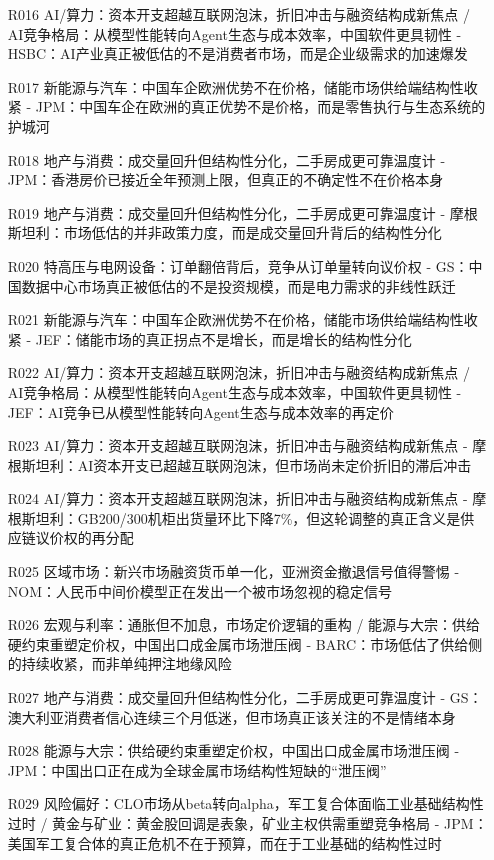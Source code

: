 \documentclass[11pt]{ctexart}
\begin{document}
\begin{itemize}
  \item [R016] AI/算力：资本开支超越互联网泡沫，折旧冲击与融资结构成新焦点 / AI竞争格局：从模型性能转向Agent生态与成本效率，中国软件更具韧性 - HSBC：AI产业真正被低估的不是消费者市场，而是企业级需求的加速爆发
  \item [R017] 新能源与汽车：中国车企欧洲优势不在价格，储能市场供给端结构性收紧 - JPM：中国车企在欧洲的真正优势不是价格，而是零售执行与生态系统的护城河
  \item [R018] 地产与消费：成交量回升但结构性分化，二手房成更可靠温度计 - JPM：香港房价已接近全年预测上限，但真正的不确定性不在价格本身
  \item [R019] 地产与消费：成交量回升但结构性分化，二手房成更可靠温度计 - 摩根斯坦利：市场低估的并非政策力度，而是成交量回升背后的结构性分化
  \item [R020] 特高压与电网设备：订单翻倍背后，竞争从订单量转向议价权 - GS：中国数据中心市场真正被低估的不是投资规模，而是电力需求的非线性跃迁
  \item [R021] 新能源与汽车：中国车企欧洲优势不在价格，储能市场供给端结构性收紧 - JEF：储能市场的真正拐点不是增长，而是增长的结构性分化
  \item [R022] AI/算力：资本开支超越互联网泡沫，折旧冲击与融资结构成新焦点 / AI竞争格局：从模型性能转向Agent生态与成本效率，中国软件更具韧性 - JEF：AI竞争已从模型性能转向Agent生态与成本效率的再定价
  \item [R023] AI/算力：资本开支超越互联网泡沫，折旧冲击与融资结构成新焦点 - 摩根斯坦利：AI资本开支已超越互联网泡沫，但市场尚未定价折旧的滞后冲击
  \item [R024] AI/算力：资本开支超越互联网泡沫，折旧冲击与融资结构成新焦点 - 摩根斯坦利：GB200/300机柜出货量环比下降7\%，但这轮调整的真正含义是供应链议价权的再分配
  \item [R025] 区域市场：新兴市场融资货币单一化，亚洲资金撤退信号值得警惕 - NOM：人民币中间价模型正在发出一个被市场忽视的稳定信号
  \item [R026] 宏观与利率：通胀但不加息，市场定价逻辑的重构 / 能源与大宗：供给硬约束重塑定价权，中国出口成金属市场泄压阀 - BARC：市场低估了供给侧的持续收紧，而非单纯押注地缘风险
  \item [R027] 地产与消费：成交量回升但结构性分化，二手房成更可靠温度计 - GS：澳大利亚消费者信心连续三个月低迷，但市场真正该关注的不是情绪本身
  \item [R028] 能源与大宗：供给硬约束重塑定价权，中国出口成金属市场泄压阀 - JPM：中国出口正在成为全球金属市场结构性短缺的“泄压阀”
  \item [R029] 风险偏好：CLO市场从beta转向alpha，军工复合体面临工业基础结构性过时 / 黄金与矿业：黄金股回调是表象，矿业主权供需重塑竞争格局 - JPM：美国军工复合体的真正危机不在于预算，而在于工业基础的结构性过时

\end{itemize}
\end{document}
